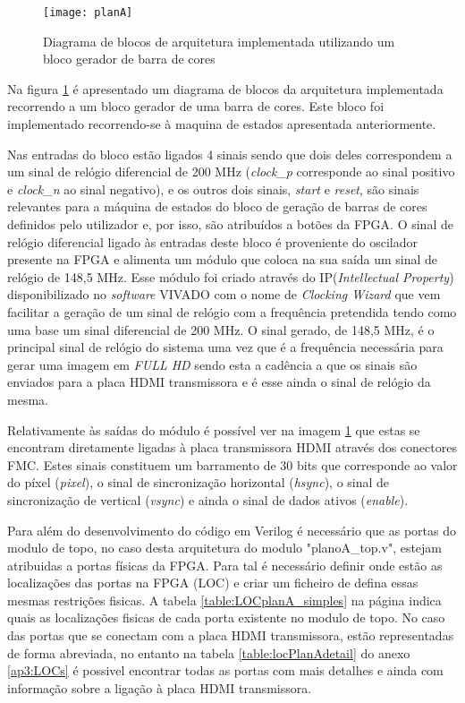 \begin{figure}[h!]
	\begin{center}
		\leavevmode
		\texttt{[image: planA]}
		\caption{Diagrama de blocos de arquitetura implementada utilizando um bloco gerador de barra de cores}
		\label{fig:planA}
	\end{center}
\end{figure}

Na figura \ref{fig:planA} é apresentado um diagrama de blocos da arquitetura implementada recorrendo a um bloco gerador de uma barra de cores. Este bloco foi implementado recorrendo-se à maquina de estados apresentada anteriormente.

Nas entradas do bloco estão ligados 4 sinais sendo que dois deles correspondem a um sinal de relógio diferencial de 200 MHz (\textit{clock\_p} corresponde ao sinal positivo e \textit{clock\_n} ao sinal negativo), e os outros dois sinais, \textit{start} e \textit{reset}, são sinais relevantes para a máquina de estados do bloco de geração de barras de cores definidos pelo utilizador e, por isso, são atribuídos a botões da FPGA. O sinal de relógio diferencial ligado às entradas deste bloco é proveniente do oscilador presente na FPGA e alimenta um módulo que coloca na sua saída um sinal de relógio de 148,5 MHz. Esse módulo foi criado através do IP(\textit{Intellectual Property}) disponibilizado no \textit{software} VIVADO com o nome de \textit{Clocking Wizard} que vem facilitar a geração de um sinal de relógio com a frequência pretendida tendo como uma base um sinal diferencial de 200 MHz. O sinal gerado, de 148,5 MHz, é o principal sinal de relógio do sistema uma vez que é a frequência necessária para gerar uma imagem em \textit{FULL HD} sendo esta a cadência a que os sinais são enviados para a placa HDMI transmissora e é esse ainda o sinal de relógio da mesma.

Relativamente às saídas do módulo é possível ver na imagem \ref{fig:planA} que estas se encontram diretamente ligadas à placa transmissora HDMI através dos conectores FMC. Estes sinais constituem um barramento de 30 bits que corresponde ao valor do píxel (\textit{pixel}), o sinal de sincronização horizontal (\textit{hsync}), o sinal de sincronização de vertical (\textit{vsync}) e ainda o sinal de dados ativos (\textit{enable}).

Para além do desenvolvimento do código em Verilog é necessário que as portas do modulo de topo, no caso desta arquitetura do modulo "planoA\_top.v", estejam atribuidas a portas físicas da FPGA. Para tal é necessário definir onde estão as localizações das portas na FPGA (LOC) e criar um ficheiro de defina essas mesmas restrições fisicas. A tabela \ref{table:LOCplanA_simples} na página \pageref{table:LOCplanA_simples} indica quais as localizações fisicas de cada porta existente no modulo de topo. No caso das portas que se conectam com a placa HDMI transmissora, estão representadas de forma abreviada, no entanto na tabela \ref{table:locPlanAdetail} do anexo \ref{ap3:LOCs} é possivel encontrar todas as portas com mais detalhes e ainda com informação sobre a ligação à placa HDMI transmissora.

